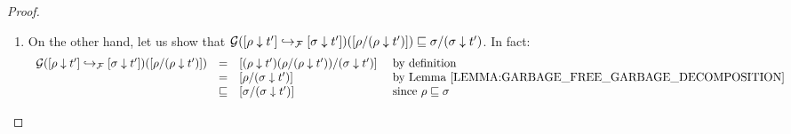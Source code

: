\begin{proof}
\begin{enumerate}
\begin{enumerate}
\begin{enumerate}
\begin{enumerate}
\[\begin{array}{rcll}
              & \permle & \redseqtwo/(\redseqtwo \sieve \tm') & \text{since $\redseq \permle \redseqtwo$ by hypothesis} \\
              \end{array}
            \]
            Note that this is garbage by .
            So by , $(\redseq \sieve \tm')/(\redseqtwo \sieve \tm')$ is also garbage,
            as required.
      \item On the other hand, let us show that
            $\mathcal{G}({[\rho \downarrow t']} \hookrightarrow_{\mathcal{F}} {[\sigma \downarrow t']})({[\rho/(\rho \downarrow t')]})
            \sqsubseteq
            \sigma/(\sigma \downarrow t')$.
            In fact:
            \[
              \begin{array}{rcll}
                \ulbG(\ptF{\cls{\redseqtwo \sieve \tm'}}{\cls{\redseq \sieve \tm'}})(\cls{\redseq/(\redseq \sieve \tm')})
              & = &
                \cls{ (\redseq \sieve \tm')(\redseq/(\redseq \sieve \tm')) / (\redseqtwo \sieve \tm') } & \text{ by definition} \\
              & = &
                \cls{ \redseq / (\redseqtwo \sieve \tm') } & \text{ by \rlem{garbage_free_garbage_decomposition}} \\
              & \permle &
                \cls{ \redseqtwo / (\redseqtwo \sieve \tm') } & \text{ since $\redseq \permle \redseqtwo$} \\
              \end{array}
            \]
             

\end{enumerate}
\end{enumerate}
\end{enumerate}
\end{enumerate}
\end{proof}
